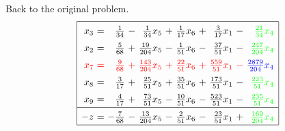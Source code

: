 \documentclass[11pt]{article}
\begin{document}
Back to the original problem.
\begin{equation*}
\renewcommand{\arraystretch}{1.5} %
\begin{array}{|rcrcrcrcrcr|}
\hline
x_{3} \mspace{-6mu}&\mspace{-6mu} = \mspace{-6mu}&\mspace{-6mu} \frac{1}{34} \mspace{-6mu}&\mspace{-6mu} - \mspace{-6mu}&\mspace{-6mu} \frac{1}{34} x_{5} \mspace{-6mu}&\mspace{-6mu} + \mspace{-6mu}&\mspace{-6mu} \frac{1}{17} x_{6} \mspace{-6mu}&\mspace{-6mu} + \mspace{-6mu}&\mspace{-6mu} \frac{3}{17} x_{1} \mspace{-6mu}&\mspace{-6mu} - \mspace{-6mu}&\color{green}\mspace{-6mu} \frac{21}{34} x_{4}\\
x_{2} \mspace{-6mu}&\mspace{-6mu} = \mspace{-6mu}&\mspace{-6mu} \frac{5}{68} \mspace{-6mu}&\mspace{-6mu} + \mspace{-6mu}&\mspace{-6mu} \frac{19}{204} x_{5} \mspace{-6mu}&\mspace{-6mu} - \mspace{-6mu}&\mspace{-6mu} \frac{1}{51} x_{6} \mspace{-6mu}&\mspace{-6mu} - \mspace{-6mu}&\mspace{-6mu} \frac{37}{51} x_{1} \mspace{-6mu}&\mspace{-6mu} - \mspace{-6mu}&\color{green}\mspace{-6mu} \frac{247}{204} x_{4}\\
\color{red}x_{7} \mspace{-6mu}&\color{red}\mspace{-6mu} = \mspace{-6mu}&\color{red}\mspace{-6mu} \frac{9}{68} \mspace{-6mu}&\color{red}\mspace{-6mu} + \mspace{-6mu}&\color{red}\mspace{-6mu} \frac{143}{204} x_{5} \mspace{-6mu}&\color{red}\mspace{-6mu} + \mspace{-6mu}&\color{red}\mspace{-6mu} \frac{22}{51} x_{6} \mspace{-6mu}&\color{red}\mspace{-6mu} + \mspace{-6mu}&\color{red}\mspace{-6mu} \frac{559}{51} x_{1} \mspace{-6mu}&\color{red}\mspace{-6mu} - \mspace{-6mu}&\color{blue}\mspace{-6mu} \frac{2879}{204} x_{4}\\
x_{8} \mspace{-6mu}&\mspace{-6mu} = \mspace{-6mu}&\mspace{-6mu} \frac{3}{17} \mspace{-6mu}&\mspace{-6mu} + \mspace{-6mu}&\mspace{-6mu} \frac{25}{51} x_{5} \mspace{-6mu}&\mspace{-6mu} + \mspace{-6mu}&\mspace{-6mu} \frac{35}{51} x_{6} \mspace{-6mu}&\mspace{-6mu} + \mspace{-6mu}&\mspace{-6mu} \frac{173}{51} x_{1} \mspace{-6mu}&\mspace{-6mu} - \mspace{-6mu}&\color{green}\mspace{-6mu} \frac{223}{51} x_{4}\\
x_{9} \mspace{-6mu}&\mspace{-6mu} = \mspace{-6mu}&\mspace{-6mu} \frac{4}{17} \mspace{-6mu}&\mspace{-6mu} + \mspace{-6mu}&\mspace{-6mu} \frac{73}{51} x_{5} \mspace{-6mu}&\mspace{-6mu} - \mspace{-6mu}&\mspace{-6mu} \frac{10}{51} x_{6} \mspace{-6mu}&\mspace{-6mu} - \mspace{-6mu}&\mspace{-6mu} \frac{523}{51} x_{1} \mspace{-6mu}&\mspace{-6mu} - \mspace{-6mu}&\color{green}\mspace{-6mu} \frac{235}{51} x_{4}\\
\hline
-z \mspace{-6mu}&\mspace{-6mu} = \mspace{-6mu}&\mspace{-6mu} -\frac{7}{68} \mspace{-6mu}&\mspace{-6mu} - \mspace{-6mu}&\mspace{-6mu} \frac{13}{204} x_{5} \mspace{-6mu}&\mspace{-6mu} - \mspace{-6mu}&\mspace{-6mu} \frac{2}{51} x_{6} \mspace{-6mu}&\mspace{-6mu} - \mspace{-6mu}&\mspace{-6mu} \frac{23}{51} x_{1} \mspace{-6mu}&\mspace{-6mu} + \mspace{-6mu}&\color{green}\mspace{-6mu} \frac{169}{204} x_{4}\\
\hline
\end{array}
\end{equation*}
\end{document}
